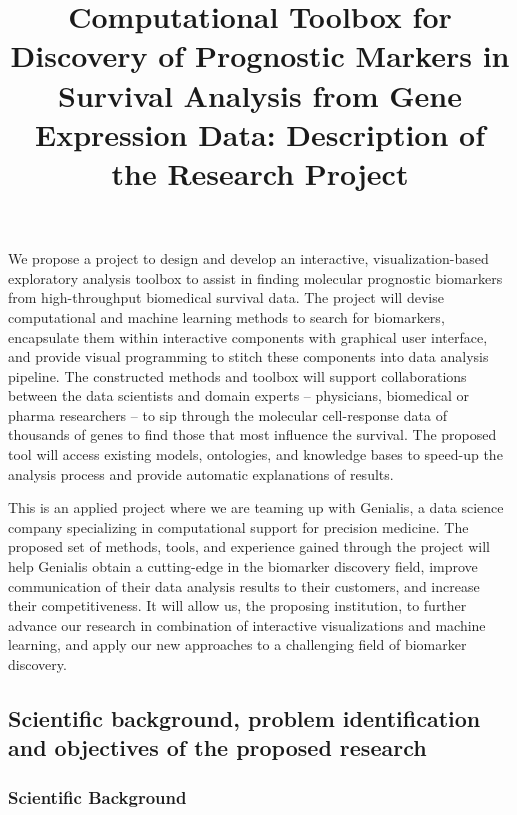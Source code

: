 \documentclass[11pt,a4paper]{article}
\begin{document}
\title{\large Computational Toolbox for Discovery of Prognostic Markers in Survival Analysis from Gene Expression Data: Description of the Research Project}
\author{}
\date{}
\maketitle
\vspace*{-1cm}

We propose a project to design and develop an interactive, visualization-based exploratory analysis toolbox to assist in finding molecular prognostic biomarkers from high-throughput biomedical survival data. The project will devise computational and machine learning methods to search for biomarkers, encapsulate them within interactive components with graphical user interface, and provide visual programming to stitch these components into data analysis pipeline. The constructed methods and toolbox will support collaborations between the data scientists and domain experts – physicians, biomedical or pharma researchers – to sip through the molecular cell-response data of thousands of genes to find those that most influence the survival. The proposed tool will access existing models, ontologies, and knowledge bases to speed-up the analysis process and provide automatic explanations of results. 

This is an applied project where we are teaming up with Genialis, a data science company specializing in computational support for precision medicine. The proposed set of methods, tools, and experience gained through the project will help Genialis obtain a cutting-edge in the biomarker discovery field, improve communication of their data analysis results to their customers, and increase their competitiveness. It will allow us, the proposing institution, to further advance our research in combination of interactive visualizations and machine learning, and apply our new approaches to a challenging field of biomarker discovery.

\subsection{Scientific background, problem identification and objectives of the proposed research}



\subsubsection*{Scientific Background}
\end{document}
